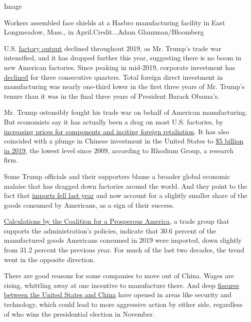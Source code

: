 Image

Workers assembled face shields at a Hasbro manufacturing facility in
East Longmeadow, Mass., in April.Credit...Adam Glanzman/Bloomberg

U.S. \href{https://fred.stlouisfed.org/graph/?g=sKQ7}{factory output}
declined throughout 2019, as Mr. Trump's trade war intensified, and it
has dropped further this year, suggesting there is no boom in new
American factories. Since peaking in mid-2019, corporate investment has
\href{https://fred.stlouisfed.org/series/PNFI}{declined} for three
consecutive quarters. Total foreign direct investment in manufacturing
was nearly one-third lower in the first three years of Mr. Trump's
tenure than it was in the final three years of President Barack Obama's.

Mr. Trump ostensibly fought his trade war on behalf of American
manufacturing. But economists say it has actually been a drag on most
U.S. factories, by
\href{https://www.federalreserve.gov/econres/feds/files/2019086pap.pdf}{increasing
prices for components and inciting foreign retaliation}. It has also
coincided with a plunge in Chinese investment in the United States to
\href{https://rhg.com/research/two-way-street-us-china-investment-trends-2020-update/}{\$5
billion in 2019}, the lowest level since 2009, according to Rhodium
Group, a research firm.

Some Trump officials and their supporters blame a broader global
economic malaise that has dragged down factories around the world. And
they point to the fact that
\href{https://www.nytimes.com/2020/02/05/business/economy/trump-trade.html}{imports
fell last year} and now account for a slightly smaller share of the
goods consumed by Americans, as a sign of their success.

\href{https://www.prosperousamerica.org/cpa_s_new_manufacturing_reshoring_index_shows_strong_gains_in_2019}{Calculations
by the Coalition for a Prosperous America}, a trade group that supports
the administration's policies, indicate that 30.6 percent of the
manufactured goods Americans consumed in 2019 were imported, down
slightly from 31.2 percent the previous year. For much of the last two
decades, the trend went in the opposite direction.

There are good reasons for some companies to move out of China. Wages
are rising, whittling away at one incentive to manufacture there. And
deep
\href{https://www.nytimes.com/2020/07/14/world/asia/cold-war-china-us.html}{fissures
between the United States and China} have opened in areas like security
and technology, which could lead to more aggressive action by either
side, regardless of who wins the presidential election in November.

